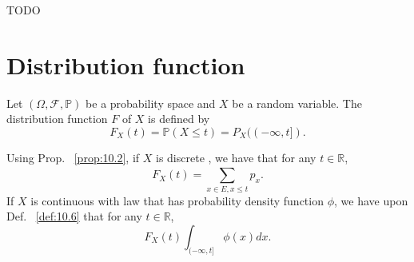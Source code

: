 \begin{example}[]
    \label{ex:10.20}
    TODO
\end{example}

\section{Distribution function}%
\label{sec:Distribution function}

\begin{definition}[]
    \label{def:10.10}
    Let $(\Omega, \mathcal{F}, \mathbb{P})$ be a probability space and $X$ be a random variable. The distribution
    function $F$ of $X$ is defined by
    \[
        F_X(t) = \mathbb{P}(X \le t) = P_X((-\infty, t])
    .\] 
    
    \begin{remark}[]
        \label{rem:10.7}
        Using Prop. ~\ref{prop:10.2}, if $X$ is discrete , we have that for any $t \in \mathbb{R}$,
        \[
        F_X(t)=\sum_{x\in E, x\le t}^{ } p_x
        .\] 
        If $X$ is continuous with law that has probability density function $\phi$, we have upon Def.
        ~\ref{def:10.6} that for any $t \in \mathbb{R}$,
        \[
            F_X(t) \int_{(-\infty, t]} \phi(x)dx
        .\] 
    \end{remark}
\end{definition}




